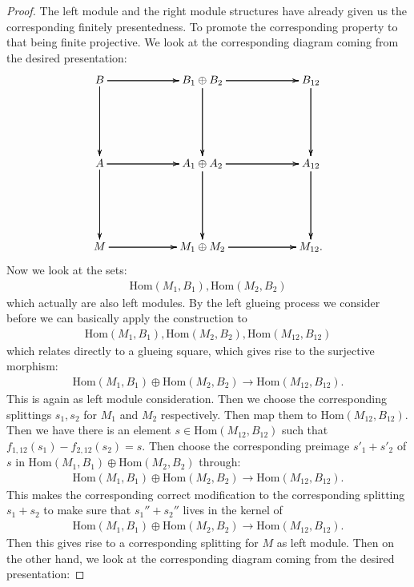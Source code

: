\documentclass[12pt]{amsart}
\theoremstyle{definition}
\numberwithin{equation}{section}
\begin{document}
\begin{proof}
The left module and the right module structures have already given us the corresponding finitely presentedness. To promote the corresponding property to that being finite projective. We look at the corresponding diagram coming from the desired presentation:
\[
\xymatrix@R+3pc@C+3pc{
B \ar[r] \ar[r] \ar[r] \ar[d] \ar[d] \ar[d] &B_1\oplus B_2 \ar[r] \ar[r] \ar[r] \ar[d] \ar[d] \ar[d] &B_{12} \ar[d] \ar[d] \ar[d]\\
A \ar[r] \ar[r] \ar[r] \ar[d] \ar[d] \ar[d] &A_1\oplus A_2 \ar[r] \ar[r] \ar[r] \ar[d] \ar[d] \ar[d] &A_{12} \ar[d] \ar[d] \ar[d]\\
M \ar[r] \ar[r] \ar[r]  &M_1\oplus M_2 \ar[r] \ar[r] \ar[r]  &M_{12}. \\
}
\]
Now we look at the sets:
\begin{align}
\mathrm{Hom}(M_1,B_1),\mathrm{Hom}(M_2,B_2)	
\end{align}
which actually are also left modules. By the left glueing process we consider before we can basically apply the construction to 
\begin{align}
\mathrm{Hom}(M_1,B_1),\mathrm{Hom}(M_2,B_2),\mathrm{Hom}(M_{12},B_{12}) 	
\end{align}	
which relates directly to a glueing square, which gives rise to the surjective morphism:
\begin{align}
\mathrm{Hom}(M_1,B_1)\oplus\mathrm{Hom}(M_2,B_2)\rightarrow \mathrm{Hom}(M_{12},B_{12}).	
\end{align}	
This is again as left module consideration. Then we choose the corresponding splittings $s_1,s_2$ for $M_1$ and $M_2$ respectively. Then map them to $\mathrm{Hom}(M_{12},B_{12})$. Then we have there is an element $s\in \mathrm{Hom}(M_{12},B_{12})$ such that $f_{1,12}(s_1)-f_{2,12}(s_2)=s$. Then choose the corresponding preimage $s'_1+s'_2$ of $s$ in $\mathrm{Hom}(M_1,B_1)\oplus\mathrm{Hom}(M_2,B_2)$ through:
\begin{align}
\mathrm{Hom}(M_1,B_1)\oplus\mathrm{Hom}(M_2,B_2)\rightarrow \mathrm{Hom}(M_{12},B_{12}).	
\end{align}
This makes the corresponding correct modification to the corresponding splitting $s_1+s_2$ to make sure that $s_1''+s_2''$ lives in the kernel of 
\begin{align}
\mathrm{Hom}(M_1,B_1)\oplus\mathrm{Hom}(M_2,B_2)\rightarrow \mathrm{Hom}(M_{12},B_{12}).	
\end{align}
Then this gives rise to a corresponding splitting for $M$ as left module. Then on the other hand, we look at the corresponding diagram coming from the desired presentation:

\end{proof}
\end{document}

